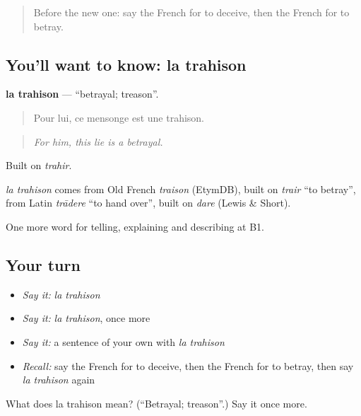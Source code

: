 \label{lesson:FR-C495-trahison}



\begin{quote}
Before the new one: say the French for to deceive, then the French for to betray.
\end{quote}

\subsection*{You'll want to know: la trahison}
\textbf{la trahison} — \textquotedblleft{}betrayal; treason\textquotedblright{}.

\begin{quote}
Pour lui, ce mensonge est une trahison.
\end{quote}

\begin{quote}
\emph{For him, this lie is a betrayal.}
\end{quote}

Built on \emph{trahir}.

\begin{cousinweb}
\emph{la trahison} comes from Old French \emph{traison} (EtymDB), built on \emph{trair} \textquotedblleft{}to betray\textquotedblright{}, from Latin \emph{trādere} \textquotedblleft{}to hand over\textquotedblright{}, built on \emph{dare} (Lewis \& Short).
\end{cousinweb}

\begin{grammarlens}[title={What you've built}]
One more word for telling, explaining and describing at B1.
\end{grammarlens}

\subsection*{Your turn}
\begin{itemize}
\raggedright
  \item \emph{Say it:} \emph{la trahison}
  \item \emph{Say it:} \emph{la trahison}, once more
  \item \emph{Say it:} a sentence of your own with \emph{la trahison}
  \item \emph{Recall:} say the French for to deceive, then the French for to betray, then say \emph{la trahison} again
\end{itemize}

\begin{tcolorbox}[breakable,colback=teal!4,colframe=teal!35!black,title={Before you move on}]
What does la trahison mean? (\textquotedblleft{}Betrayal; treason\textquotedblright{}.) Say it once more.
\end{tcolorbox}
